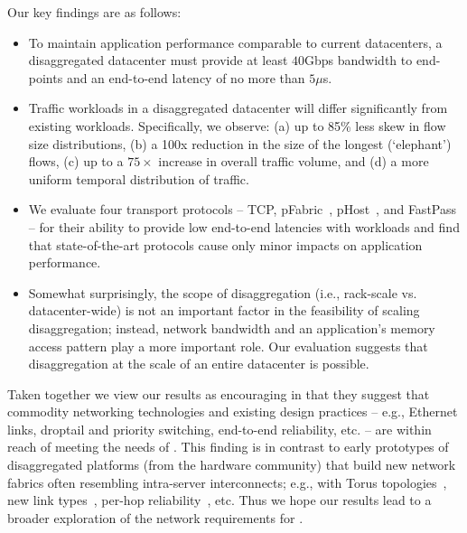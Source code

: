 \vspace{0.5em}
\noindent Our key findings are as follows:
\vspace{-0.5em}
\begin{itemize}[leftmargin=*]
\itemsep0em
	\item To maintain application performance comparable to current datacenters, a disaggregated datacenter must provide at least $40$Gbps bandwidth to end-points and an end-to-end latency of no more than $5\mu$s.
	\item Traffic workloads in a disaggregated datacenter will differ significantly from existing workloads. Specifically, we observe: (a) up to 85\% less skew in flow size distributions, (b) a 100x reduction in the size of the longest (`elephant') flows, (c) up to a $75\times$ increase in overall traffic volume, and (d) a more uniform temporal distribution of traffic.
	\item We evaluate four transport protocols -- TCP, pFabric~\cite{pfabric}, pHost~\cite{phost}, and  FastPass~\cite{fastpass} -- for their ability to provide low end-to-end latencies with \dis workloads and find that  state-of-the-art protocols cause only minor impacts on application performance. 
	\item Somewhat surprisingly, the scope of disaggregation (i.e., rack-scale vs. datacenter-wide) is not an important factor in the feasibility of scaling disaggregation; instead, network bandwidth and an application's memory access pattern play a more important role. Our evaluation suggests that disaggregation at the scale of an entire datacenter is possible.
	
\end{itemize} 
	
\noindent	
Taken together we view our results as encouraging in that they suggest that commodity networking technologies and existing design practices -- e.g., Ethernet links, droptail and priority switching, end-to-end reliability, etc. -- are within reach of meeting the needs of \dis. This finding is in contrast to early prototypes of disaggregated platforms (from the hardware community) that build new network fabrics often resembling intra-server interconnects; e.g., with Torus  topologies~\cite{seamicro}, new link types~\cite{intel-si-photonics}, per-hop reliability~\cite{infiniband}, etc. Thus we hope our results lead to a broader exploration of the network requirements for \dis.
	
